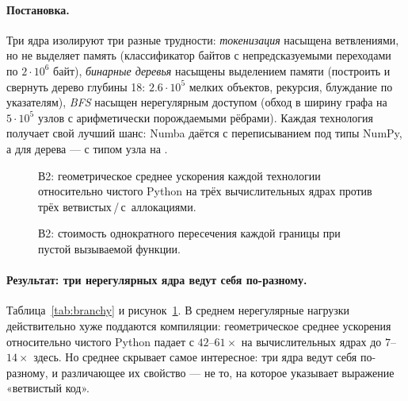 \paragraph{Постановка.} Три ядра изолируют три разные трудности: \emph{токенизация} насыщена
ветвлениями, но не выделяет память (классификатор байтов с непредсказуемыми переходами по
$2\cdot10^6$ байт), \emph{бинарные деревья} насыщены выделением памяти (построить и свернуть
дерево глубины 18: $2.6\cdot10^5$ мелких объектов, рекурсия, блуждание по указателям), \emph{BFS}
насыщен нерегулярным доступом (обход в ширину графа на $5\cdot10^5$ узлов с арифметически
порождаемыми рёбрами). Каждая технология получает свой лучший шанс: Numba даётся с переписыванием
под типы NumPy, а для дерева --- с типом узла на .

\begin{table}[t]
  \centering
  \caption{В2: ветвистые ядра, ядра с выделением памяти и с нерегулярным доступом на
    CPython 3.14.6.}
  \label{tab:branchy}
  \small
  
\end{table}

\begin{figure}[t]
  \centering
  \caption{В2: геометрическое среднее ускорения каждой технологии относительно чистого Python на
    трёх вычислительных ядрах против трёх ветвистых\,/\,с~аллокациями.}
  \label{fig:divergence}
\end{figure}

\begin{figure}[t]
  \centering
  \caption{В2: стоимость однократного пересечения каждой границы при пустой вызываемой функции.}
  \label{fig:ffi}
\end{figure}

\paragraph{Результат: три нерегулярных ядра ведут себя по-разному.}
Таблица~\ref{tab:branchy} и рисунок~\ref{fig:divergence}. В среднем нерегулярные нагрузки
действительно хуже поддаются компиляции: геометрическое среднее ускорения относительно чистого
Python падает с $42$--$61\times$ на вычислительных ядрах до $7$--$14\times$ здесь. Но среднее
скрывает самое интересное: три ядра ведут себя по-разному, и различающее их свойство --- не то,
на которое указывает выражение «ветвистый код».

